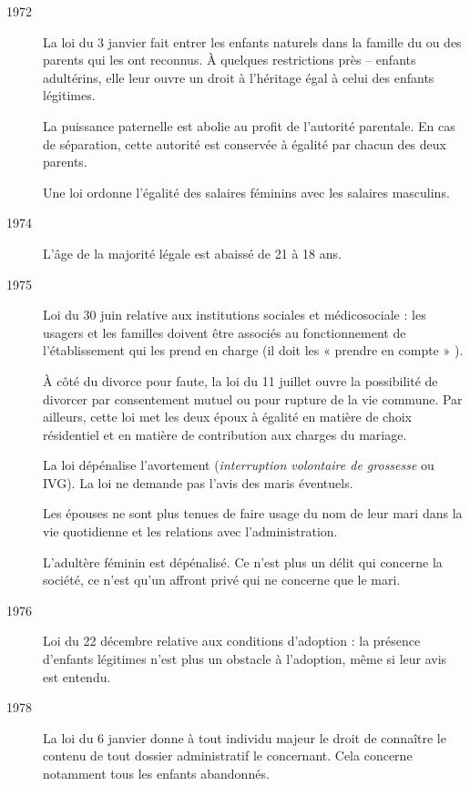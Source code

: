 \begin{description}
\item[1972] La loi du 3 janvier fait entrer les enfants naturels dans la famille du ou des parents qui les ont reconnus. À quelques restrictions près -- enfants adultérins, elle leur ouvre un droit à l'héritage égal à celui des enfants légitimes.

La puissance paternelle est abolie au profit de l'autorité parentale. En cas de séparation, cette autorité est conservée à égalité par chacun des deux parents. 

Une loi ordonne l'égalité des salaires féminins avec les salaires masculins.

\item[1974] L'âge de la majorité légale est abaissé de 21 à 18 ans. 

\item[1975] Loi du 30 juin relative aux institutions sociales et médicosociale : les usagers et les familles doivent être associés au fonctionnement de l'établissement qui les prend en charge (il doit les « prendre en compte » ). 

À côté du divorce pour faute, la loi du 11 juillet ouvre la possibilité de divorcer par consentement mutuel ou pour rupture de la vie commune. Par ailleurs, cette loi met les deux époux à égalité en matière de choix résidentiel et en matière de contribution aux charges du mariage.

La loi  dépénalise l'avortement (\emph{interruption volontaire de grossesse} ou IVG). La loi ne demande pas l'avis des maris éventuels.

Les épouses ne sont plus tenues de faire usage du nom de leur mari dans la vie quotidienne et les relations avec l'administration.

L'adultère féminin est dépénalisé. Ce n'est plus un délit qui concerne la société, ce n'est qu'un affront privé qui ne concerne que le mari.

\item[1976] Loi du 22 décembre relative aux conditions d'adoption : la présence d'enfants légitimes n'est plus un obstacle à l'adoption, même si leur avis est entendu. 

\item[1978] La loi du 6 janvier donne à tout individu majeur le droit de connaître le contenu de tout dossier administratif le concernant. Cela concerne notamment tous les enfants abandonnés.


\end{description}

